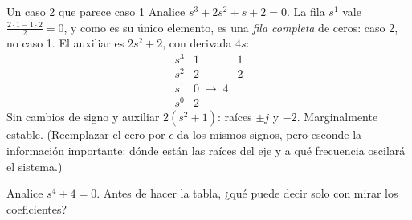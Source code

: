 \begin{ejemplo}[label=ej:es-caso2b]{Un caso 2 que parece caso 1}
Analice $s^3+2s^2+s+2=0$.
\solucion La fila $s^1$ vale $\frac{2\cdot1-1\cdot2}{2}=0$, y como es su único elemento, es una \emph{fila completa} de ceros: caso 2, no caso 1. El auxiliar es $2s^2+2$, con derivada $4s$:
\[
\begin{array}{c|cc}
  s^3 & 1 & 1\\
  s^2 & 2 & 2\\
  s^1 & 0\;\to\;4\\
  s^0 & 2
\end{array}
\]
Sin cambios de signo y auxiliar $2(s^2+1)$: raíces $\pm j$ y $-2$. Marginalmente estable. (Reemplazar el cero por $\epsilon$ da los mismos signos, pero esconde la información importante: dónde están las raíces del eje y a qué frecuencia oscilará el sistema.)
\end{ejemplo}


\begin{pausa}
Analice $s^4+4=0$. Antes de hacer la tabla, ¿qué puede decir solo con mirar los coeficientes?
\end{pausa}
